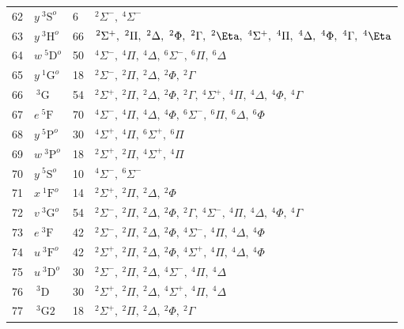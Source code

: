 \begin{table*}[]
\begin{tabular*}{\textwidth}{llll@{\extracolsep{\fill}}}
 62 & $ y~^3\mathrm{S}^o $ &    6& $   ^{2}\Sigma^-,\   ^{4}\Sigma^-$ \\
 63 & $ y~^3\mathrm{H}^o $ &   66& $   ^{2}\Sigma^+,\  ^{2}\Pi,\     ^{2}\Delta,\ ^{2}\Phi,\     ^{2}\Gamma,\ ^{2}\Eta,\   ^{4}\Sigma^+,\  ^{4}\Pi,\     ^{4}\Delta,\ ^{4}\Phi,\     ^{4}\Gamma,\ ^{4}\Eta$ \\
 64 & $ w~^5\mathrm{D}^o $ &   50& $   ^{4}\Sigma^-,\  ^{4}\Pi,\     ^{4}\Delta,\   ^{6}\Sigma^-,\  ^{6}\Pi,\     ^{6}\Delta$ \\
 65 & $ y~^1\mathrm{G}^o $ &   18& $   ^{2}\Sigma^-,\  ^{2}\Pi,\     ^{2}\Delta,\ ^{2}\Phi,\     ^{2}\Gamma$ \\
 66 & $    ~^3\mathrm{G} $ &   54& $   ^{2}\Sigma^+,\  ^{2}\Pi,\     ^{2}\Delta,\ ^{2}\Phi,\     ^{2}\Gamma,\   ^{4}\Sigma^+,\  ^{4}\Pi,\     ^{4}\Delta,\ ^{4}\Phi,\     ^{4}\Gamma$ \\
 67 & $   e~^5\mathrm{F} $ &   70& $   ^{4}\Sigma^-,\  ^{4}\Pi,\     ^{4}\Delta,\ ^{4}\Phi,\   ^{6}\Sigma^-,\  ^{6}\Pi,\     ^{6}\Delta,\ ^{6}\Phi$ \\
 68 & $ y~^5\mathrm{P}^o $ &   30& $   ^{4}\Sigma^+,\  ^{4}\Pi,\   ^{6}\Sigma^+,\  ^{6}\Pi$ \\
 69 & $ w~^3\mathrm{P}^o $ &   18& $   ^{2}\Sigma^+,\  ^{2}\Pi,\   ^{4}\Sigma^+,\  ^{4}\Pi$ \\
 70 & $ y~^5\mathrm{S}^o $ &   10& $   ^{4}\Sigma^-,\   ^{6}\Sigma^-$ \\
 71 & $ x~^1\mathrm{F}^o $ &   14& $   ^{2}\Sigma^+,\  ^{2}\Pi,\     ^{2}\Delta,\ ^{2}\Phi$ \\
 72 & $ v~^3\mathrm{G}^o $ &   54& $   ^{2}\Sigma^-,\  ^{2}\Pi,\     ^{2}\Delta,\ ^{2}\Phi,\     ^{2}\Gamma,\   ^{4}\Sigma^-,\  ^{4}\Pi,\     ^{4}\Delta,\ ^{4}\Phi,\     ^{4}\Gamma$ \\
 73 & $   e~^3\mathrm{F} $ &   42& $   ^{2}\Sigma^-,\  ^{2}\Pi,\     ^{2}\Delta,\ ^{2}\Phi,\   ^{4}\Sigma^-,\  ^{4}\Pi,\     ^{4}\Delta,\ ^{4}\Phi$ \\
 74 & $ u~^3\mathrm{F}^o $ &   42& $   ^{2}\Sigma^+,\  ^{2}\Pi,\     ^{2}\Delta,\ ^{2}\Phi,\   ^{4}\Sigma^+,\  ^{4}\Pi,\     ^{4}\Delta,\ ^{4}\Phi$ \\
 75 & $ u~^3\mathrm{D}^o $ &   30& $   ^{2}\Sigma^-,\  ^{2}\Pi,\     ^{2}\Delta,\   ^{4}\Sigma^-,\  ^{4}\Pi,\     ^{4}\Delta$ \\
 76 & $    ~^3\mathrm{D} $ &   30& $   ^{2}\Sigma^+,\  ^{2}\Pi,\     ^{2}\Delta,\   ^{4}\Sigma^+,\  ^{4}\Pi,\     ^{4}\Delta$ \\
 77 & $   ~^3\mathrm{G2} $ &   18& $   ^{2}\Sigma^+,\  ^{2}\Pi,\     ^{2}\Delta,\ ^{2}\Phi,\     ^{2}\Gamma$ \\

\end{tabular*}
\end{table*}
